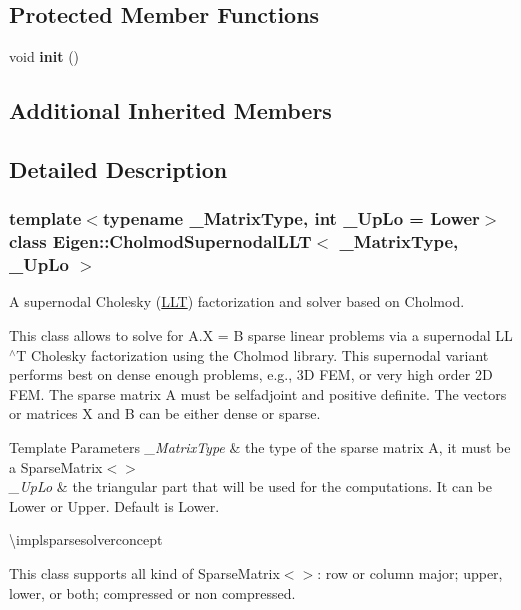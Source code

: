 \subsection*{Protected Member Functions}
\begin{DoxyCompactItemize}
\item 
\mbox{\label{class_eigen_1_1_cholmod_supernodal_l_l_t_a06172bfd8b6408d1291246c0535e1684}} 
void {\bfseries init} ()
\end{DoxyCompactItemize}
\subsection*{Additional Inherited Members}


\subsection{Detailed Description}
\subsubsection*{template$<$typename \+\_\+\+Matrix\+Type, int \+\_\+\+Up\+Lo = Lower$>$\newline
class Eigen\+::\+Cholmod\+Supernodal\+L\+L\+T$<$ \+\_\+\+Matrix\+Type, \+\_\+\+Up\+Lo $>$}

A supernodal Cholesky (\mbox{\hyperlink{class_eigen_1_1_l_l_t}{L\+LT}}) factorization and solver based on Cholmod. 

This class allows to solve for A.\+X = B sparse linear problems via a supernodal L\+L$^\wedge$T Cholesky factorization using the Cholmod library. This supernodal variant performs best on dense enough problems, e.\+g., 3D F\+EM, or very high order 2D F\+EM. The sparse matrix A must be selfadjoint and positive definite. The vectors or matrices X and B can be either dense or sparse.


\begin{DoxyTemplParams}{Template Parameters}
{\em \+\_\+\+Matrix\+Type} & the type of the sparse matrix A, it must be a Sparse\+Matrix$<$$>$ \\
\hline
{\em \+\_\+\+Up\+Lo} & the triangular part that will be used for the computations. It can be Lower or Upper. Default is Lower.\\
\hline
\end{DoxyTemplParams}
\textbackslash{}implsparsesolverconcept

This class supports all kind of Sparse\+Matrix$<$$>$\+: row or column major; upper, lower, or both; compressed or non compressed.

